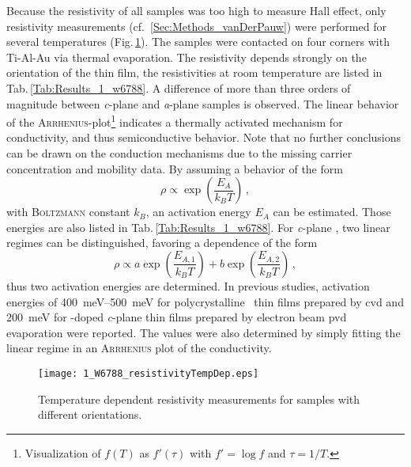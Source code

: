 Because the resistivity of all samples was too high to measure Hall effect, only resistivity measurements (cf.~\ref{Sec:Methods_vanDerPauw}) were performed for several temperatures (Fig.\,\ref{Fig:Results_1_w6788_TdH}).
The samples were contacted on four corners with Ti-Al-Au via thermal evaporation.
The resistivity depends strongly on the orientation of the thin film, the resistivities at room temperature are listed in Tab.\,\ref{Tab:Results_1_w6788}.
A difference of more than three orders of magnitude between \textit{c}-plane and \textit{a}-plane samples is observed.
The linear behavior of the \textsc{Arrhenius}-plot\footnote{
    Visualization of $f(T)$ as $f'(\tau)$ with $f'=\log f$ and $\tau=1/T$.
}
indicates a thermally activated mechanism for conductivity, and thus semiconductive behavior.
Note that no further conclusions can be drawn on the conduction mechanisms due to the missing carrier concentration and mobility data.
By assuming a behavior of the form
\begin{equation}
    \label{Equ:Results_1_Arrhenius}
    \rho\propto\exp\left(\frac{E_A}{k_BT}\right)\,,
\end{equation}
with \textsc{Boltzmann} constant $k_B$, an activation energy $E_A$ can be estimated.
Those energies are also listed in Tab.\,\ref{Tab:Results_1_w6788}.
For \textit{c}-plane \cro, two linear regimes can be distinguished, favoring a dependence of the form
\begin{equation}
    \label{Equ:Results_1_Arrhenius2}
    \rho\propto a\exp\left(\frac{E_{A,1}}{k_BT}\right)
    +b\exp\left(\frac{E_{A,2}}{k_BT}\right)\,,
\end{equation}
thus two activation energies are determined.
In previous studies, activation energies of \qtyrange{400}{500}{\milli\eV} for polycrystalline \cro\ thin films prepared by \gls{cvd}
    \cite{cheng1996}
and \qty{200}{\milli\eV} for -doped \textit{c}-plane thin films prepared by electron beam \gls{pvd} evaporation
    \cite{farrell2015}
were reported.
The values were also determined by simply fitting the linear regime in an \textsc{Arrhenius} plot of the conductivity.
\begin{figure}
    \centering
    \texttt{[image: 1\_W6788\_resistivityTempDep.eps]}
    \caption{
        Temperature dependent resistivity measurements for samples with different orientations.
    }
    \label{Fig:Results_1_w6788_TdH}
\end{figure}